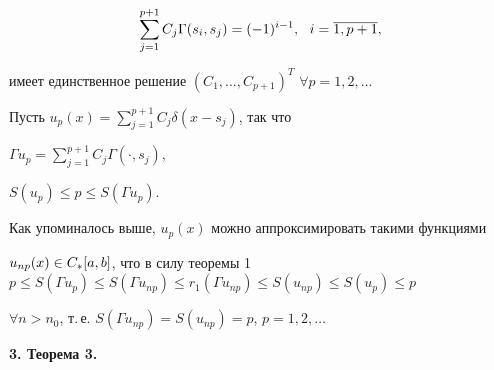 $$


\sum^{p+1}_{j=1}C_j\Gamma(s_i,s_j)=(-1)^{i-1},\ \ i=\o{1,p+1},


$$


имеет единственное решение $(C_1,\dotsc,C_{p+1})^T$ \; $\forall p=1,2,\dotsc$


Пусть $u_p(x)=\sum\limits^{p+1}_{j=1}C_j\delta(x-s_j)$, так что


$\Gamma u_p=\sum\limits^{p+1}_{j=1}C_j\Gamma(\cdot,s_j)$,


$S(u_p)\le p\le S(\Gamma u_p)$.


Как упоминалось выше, $u_p(x)$ можно аппроксимировать такими функциями


$u_{np}(x)\in C_*\ab$, что в силу теоремы 1 \ $p\le S(\Gamma u_p)\le


S(\Gamma u_{np})\le r_1(\Gamma u_{np})\le S(u_{np})\le S(u_p)\le p$ \;


$\forall n>n_0$, т.\,е. $S(\Gamma u_{np})=S(u_{np})=p$, $p=1,2,\dotsc$


\medskip





{\bf 3. Теорема 3.}


